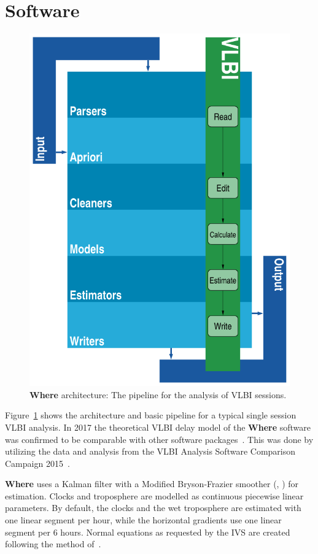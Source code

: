 \documentclass[twocolumn,twoside]{svmultivs_gm} %
\begin{document}
\section{Software}


\begin{figure}[!htbp]
\includegraphics[width=0.8\linewidth]{kirkvik01}
\caption{\textbf{Where} architecture: The pipeline for the analysis of VLBI sessions.}
\label{fig:architecture}
\end{figure}

Figure~\ref{fig:architecture} shows the architecture and basic pipeline for a typical single session VLBI
analysis. In 2017 the theoretical VLBI delay model of the \textbf{Where} software was confirmed to be comparable with other
software packages~\cite{kirkvik2017b}.  This was done by utilizing the data and analysis from the VLBI Analysis Software
Comparison Campaign 2015~\cite{klopotek2016}.

\textbf{Where} uses a Kalman filter with a Modified Bryson-Frazier smoother (\cite{bierman2006}, \cite{gibbs2011}) for
estimation. Clocks and troposphere are modelled as continuous piecewise linear parameters. By default, the clocks and
the wet troposphere are estimated with one linear segment per hour, while the horizontal gradients use one linear segment per 6
hours. Normal equations as requested by the IVS are created following the method of~\cite{mysen2017}.
\end{document}
